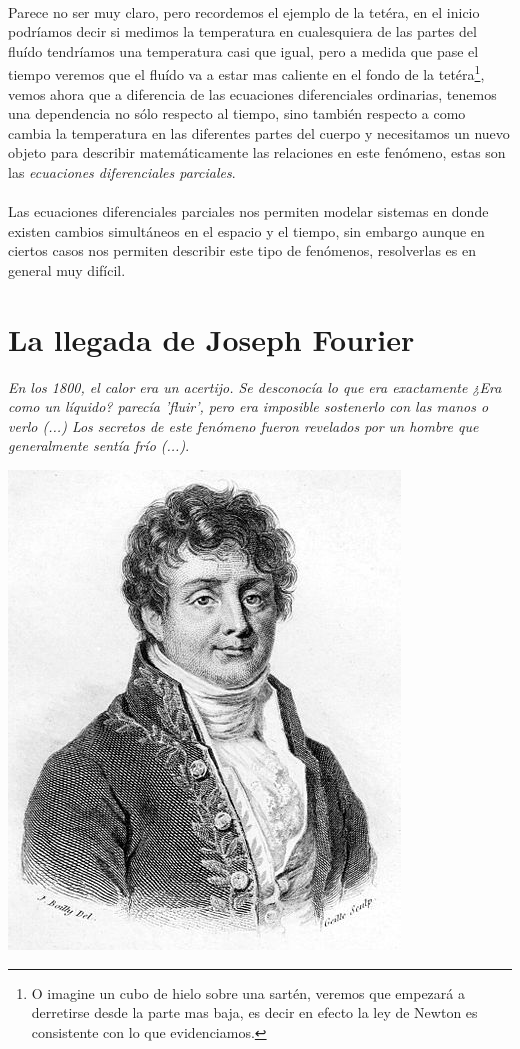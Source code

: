 \documentclass{article}
\begin{document}
\paragraph{}Parece no ser muy claro, pero recordemos el ejemplo de la tetéra, en el inicio podríamos decir si medimos la temperatura en cualesquiera de las partes del fluído tendríamos una temperatura casi que igual, pero a medida que pase el tiempo veremos que el fluído va a estar mas caliente en el fondo de la tetéra\footnote{O imagine un cubo de hielo sobre una sartén, veremos que empezará a derretirse desde la parte mas baja, es decir en efecto la  ley de Newton es consistente con lo que evidenciamos.}, vemos ahora que a diferencia de las ecuaciones diferenciales ordinarias, tenemos una dependencia no sólo respecto al tiempo, sino también respecto a como cambia la temperatura en las diferentes partes del cuerpo y necesitamos un nuevo objeto para describir matemáticamente las relaciones en este fenómeno, estas son las \textit{ecuaciones diferenciales parciales}.
\paragraph{}Las ecuaciones diferenciales parciales nos permiten modelar sistemas en donde existen cambios simultáneos en el espacio y el tiempo\cite{stevenstrogatz2019}, sin embargo aunque en ciertos casos nos permiten describir este tipo de fenómenos, resolverlas es en general muy difícil.
\section{La llegada de Joseph Fourier}
\begin{center}
\textit{En los 1800, el calor era un acertijo. Se desconocía lo que era exactamente ¿Era como un líquido? parecía 'fluir', pero era imposible sostenerlo con las manos o verlo (...) Los secretos de este fenómeno fueron revelados por un hombre que generalmente sentía frío (...)}\cite{stevenstrogatz2019}.
\end{center}
\begin{center}
    \includegraphics[width=0.2\linewidth]{heat_equation_article/img/393px-Joseph_Fourier.jpg}
\end{center}
\end{document}
